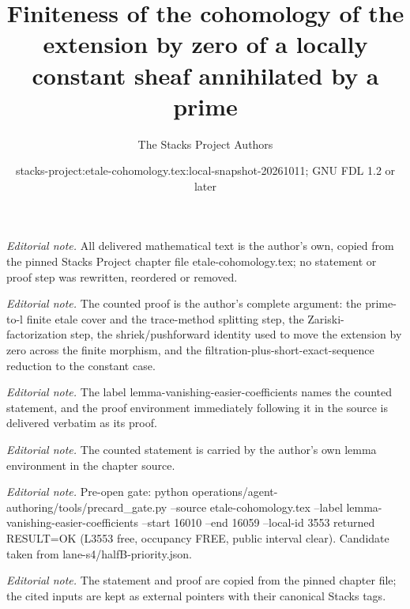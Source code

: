 \documentclass[10pt,a4paper]{amsart}
\title{Finiteness of the cohomology of the extension by zero of a locally constant sheaf annihilated by a prime}
\author{The Stacks Project Authors}
\date{stacks-project:etale-cohomology.tex:local-snapshot-20261011; GNU FDL 1.2 or later}
\theoremstyle{plain}
\theoremstyle{definition}
\theoremstyle{remark}
\numberwithin{equation}{subsection}
\begin{document}
\maketitle
\noindent\textit{Editorial note.} All delivered mathematical text is the author's own, copied from the pinned Stacks Project chapter file etale-cohomology.tex; no statement or proof step was rewritten, reordered or removed.\par\medskip
\noindent\textit{Editorial note.} The counted proof is the author's complete argument: the prime-to-l finite etale cover and the trace-method splitting step, the Zariski-factorization step, the shriek/pushforward identity used to move the extension by zero across the finite morphism, and the filtration-plus-short-exact-sequence reduction to the constant case.\par\medskip
\noindent\textit{Editorial note.} The label lemma-vanishing-easier-coefficients names the counted statement, and the proof environment immediately following it in the source is delivered verbatim as its proof.\par\medskip
\noindent\textit{Editorial note.} The counted statement is carried by the author's own lemma environment in the chapter source.\par\medskip
\noindent\textit{Editorial note.} Pre-open gate: python operations/agent-authoring/tools/precard\_gate.py --source etale-cohomology.tex --label lemma-vanishing-easier-coefficients --start 16010 --end 16059 --local-id 3553 returned RESULT=OK (L3553 free, occupancy FREE, public interval clear). Candidate taken from lane-s4/halfB-priority.json.\par\medskip
\noindent\textit{Editorial note.} The statement and proof are copied from the pinned chapter file; the cited inputs are kept as external pointers with their canonical Stacks tags.\par\medskip
\end{document}
